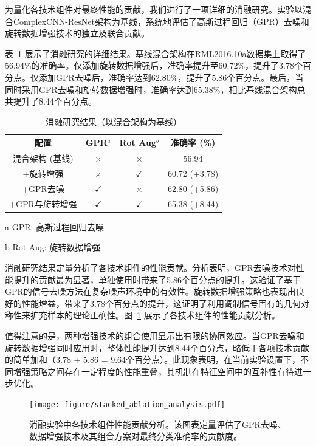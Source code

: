 \documentclass[conference]{IEEEtran}
\begin{document}
为量化各技术组件对最终性能的贡献，我们进行了一项详细的消融研究。实验以混合ComplexCNN-ResNet架构为基线，系统地评估了高斯过程回归（GPR）去噪和旋转数据增强技术的独立及联合贡献。

表~\ref{tab:ablation_study} 展示了消融研究的详细结果。基线混合架构在RML2016.10a数据集上取得了56.94\%的准确率。仅添加旋转数据增强后，准确率提升至60.72\%，提升了3.78个百分点。仅添加GPR去噪后，准确率达到62.80\%，提升了5.86个百分点。最后，当同时采用GPR去噪和旋转数据增强时，准确率达到65.38\%，相比基线混合架构总共提升了8.44个百分点。

\begin{table}[!htbp]
\centering
\caption{消融研究结果（以混合架构为基线）}
\label{tab:ablation_study}
\begin{threeparttable}
\begin{tabular}{@{}cccc@{}}
\toprule
配置 & GPR$^{a}$ & Rot Aug$^{b}$ & 准确率 (\%) \\
\midrule
混合架构 (基线) & $\times$ & $\times$ & 56.94 \\
+旋转增强 & $\times$ & $\checkmark$ & 60.72 (+3.78) \\
+GPR去噪 & $\checkmark$ & $\times$ & 62.80 (+5.86) \\
+GPR与旋转增强 & $\checkmark$ & $\checkmark$ & 65.38 (+8.44) \\
\bottomrule
\end{tabular}
\begin{tablenotes}
\footnotesize
\item[a] GPR: 高斯过程回归去噪
\item[b] Rot Aug: 旋转数据增强
\end{tablenotes}
\end{threeparttable}
\end{table}

消融研究结果定量分析了各技术组件的性能贡献。分析表明，GPR去噪技术对性能提升的贡献最为显著，单独使用时带来了5.86个百分点的提升。这验证了基于GPR的信号去噪方法在复杂噪声环境中的有效性。旋转数据增强策略也表现出良好的性能增益，带来了3.78个百分点的提升，这证明了利用调制信号固有的几何对称性来扩充样本的理论正确性。图~\ref{fig:ablation_components} 展示了各技术组件的性能贡献分析。

值得注意的是，两种增强技术的组合使用显示出有限的协同效应。当GPR去噪和旋转数据增强同时应用时，整体性能提升达到8.44个百分点，略低于各项技术贡献的简单加和（3.78 + 5.86 = 9.64个百分点）。此现象表明，在当前实验设置下，不同增强策略之间存在一定程度的性能重叠，其机制在特征空间中的互补性有待进一步优化。

\begin{figure}[htbp]
\centering
\texttt{[image: figure/stacked\_ablation\_analysis.pdf]}
\caption{消融实验中各技术组件性能贡献分析。该图表定量评估了GPR去噪、数据增强技术及其组合方案对最终分类准确率的贡献度。}
\label{fig:ablation_components}
\end{figure}
\end{document}
